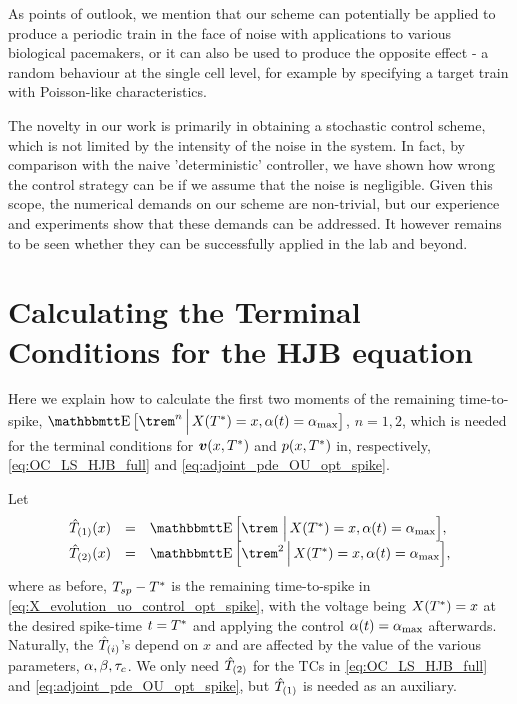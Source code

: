 
As points of outlook, we mention that our scheme can potentially be applied to
produce a periodic train in the face of noise with applications to various
biological pacemakers, or it can also be used to produce the opposite effect - a
random behaviour at the single cell level, for example by specifying a target
train with Poisson-like characteristics.

The novelty in our work is primarily in obtaining a stochastic control scheme,
which is not limited by the intensity of the noise in the system. In fact, by
comparison with the naive 'deterministic' controller, we have shown how wrong
the control strategy can be if we assume that the noise is negligible. Given
this scope, the numerical demands on our scheme are non-trivial, but our
experience and experiments show that these demands can be addressed.
It however remains to be seen whether they can be successfully applied in the lab
and beyond.


\section{Calculating the Terminal Conditions for the HJB equation}
\label{sec:valuefun_TCs}
Here we explain how to calculate the first two moments of the remaining
time-to-spike, $\Exp \big[\trem^n \,\Big|\, X(\T) = x, \a(t) = \amax
\big]$, $n=1,2$, which is needed for the terminal conditions for ${ \boldsymbol{v} }(x,{ T^* })$
and $p(x,{ T^* })$ in, respectively, \cref{eq:OC_LS_HJB_full} and
\cref{eq:adjoint_pde_OU_opt_spike}.

Let
\begin{equation}
\begin{array}{lcl}
\Tone(x) &=& \Exp \Big[\trem \,\,\Big|\, X(\T) = x, \a(t) = \amax
\Big],
\\
\Ttwo(x) &=&
\Exp \Big[\trem^2 \,\Big|\, X(\T) = x, \a(t) = \amax \Big],
\end{array}
\end{equation}
where as before, $T_{sp}-{ T^* }$ is the remaining time-to-spike in
\cref{eq:X_evolution_uo_control_opt_spike}, with the voltage being $X({ T^* }) = x$ at the desired
spike-time $t={ T^* }$ and applying the control $\alpha(t) = { \alpha_{\textrm{max}} }$ afterwards.
Naturally, the ${ \hat{T}_{(i)} }$'s depend on $x$ and are affected by the value of the
various parameters, $\alpha,\beta,\tau_c$. We only  need ${ \hat{T}_{(2)} }$ for the TCs in
\cref{eq:OC_LS_HJB_full} and \cref{eq:adjoint_pde_OU_opt_spike}, but ${ \hat{T}_{(1)} }$ is needed as
an auxiliary. 
  
